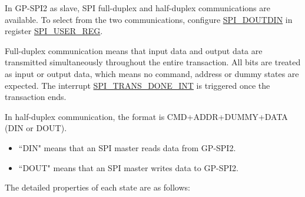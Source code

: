 \documentclass[main\_\_EN.tex]{subfiles}
\begin{document}
In GP-SPI2 as slave, SPI full-duplex and half-duplex communications are available. To select from the two communications, configure \hyperref[fielddesc:SPIDOUTDIN]{SPI\_DOUTDIN} in register \hyperref[regdesc:SPIUSERREG]{SPI\_USER\_REG}.

Full-duplex communication means that input data and output data are transmitted simultaneously throughout the entire transaction. All bits are treated as input or output data, which means no command, address or dummy states are expected. The interrupt \hyperref[int:SPITRANSDONEINT]{SPI\_TRANS\_DONE\_INT} is triggered once the transaction ends.  

In half-duplex communication, the format is CMD+ADDR+DUMMY+DATA (DIN or DOUT).
\begin{itemize}
    \item ``DIN" means that an SPI master reads data from GP-SPI2.
    \item ``DOUT" means that an SPI master writes data to GP-SPI2.
\end{itemize}

The detailed properties of each state are as follows:
\end{document}
